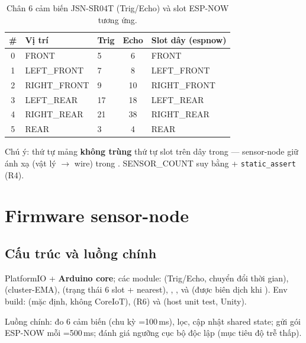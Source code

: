 \begin{center}
\small
\renewcommand{\arraystretch}{1.15}
\begin{longtable}{@{}cllcl@{}}
\caption{Chân 6 cảm biến JSN-SR04T (Trig/Echo) và slot ESP-NOW tương ứng.}\\
\toprule
\textbf{\#} & \textbf{Vị trí} & \textbf{Trig} & \textbf{Echo} & \textbf{Slot dây (espnow)} \\
\midrule
\endhead
0 & FRONT        & 5  & 6  & FRONT \\
1 & LEFT\_FRONT  & 7  & 8  & LEFT\_FRONT \\
2 & RIGHT\_FRONT & 9  & 10 & RIGHT\_FRONT \\
3 & LEFT\_REAR   & 17 & 18 & LEFT\_REAR \\
4 & RIGHT\_REAR  & 21 & 38 & RIGHT\_REAR \\
5 & REAR         & 3  & 4  & REAR \\
\bottomrule
\end{longtable}
\label{tab:gpio}
\end{center}

Chú ý: thứ tự mảng  \textbf{không trùng} thứ tự slot trên dây trong
 — sensor-node giữ ánh xạ 
(vật lý $\rightarrow$ wire) trong . SENSOR\_COUNT suy bằng
 + \verb+static_assert+ (R4).

\section{Firmware sensor-node}
\label{sec:sys-sensor}

\subsection{Cấu trúc và luồng chính}
PlatformIO + \textbf{Arduino core}; các module: 
(Trig/Echo, chuyển đổi thời gian),  (cluster-EMA),
 (trạng thái 6 slot + nearest), , ,
và  (được biên dịch khi
). Env build:  (mặc định, không CoreIoT),
 (R6) và  (host unit test, Unity).

Luồng chính: đo 6 cảm biến (chu kỳ =100\,ms), lọc, cập nhật
shared state;  gửi gói ESP-NOW mỗi
=500\,ms;  đánh giá ngưỡng cục bộ độc lập
(mục tiêu độ trễ thấp).

